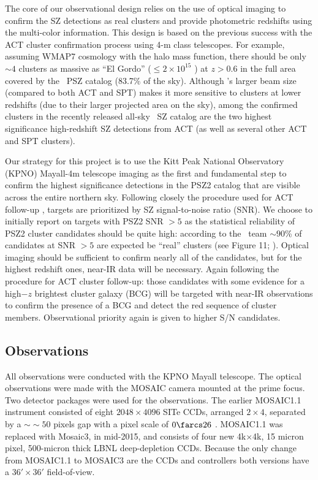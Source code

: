 \documentclass[apj, revtex4-1]{emulateapj}
\begin{document}
The core of our observational design relies on the use of optical imaging to confirm the SZ detections as real clusters and provide photometric redshifts using the multi-color information. This design is based on the previous success with the ACT cluster confirmation process using 4-m class telescopes.
%
For example, assuming WMAP7 cosmology \citep{Komatsu2011} with the \cite{Tinker2008} halo mass function, there should be only $\sim4$ clusters as massive as “El Gordo” ($\leq 2 \times 10^{15}$ \Msol) at $z > 0.6$ in the full area covered by the \planck\ PSZ catalog (83.7\% of the sky). Although \planck’s larger beam size (compared to both ACT and SPT) makes it more sensitive to clusters at lower redshifts (due to their larger projected area on the sky), among the confirmed clusters in the recently released all-sky \planck\ SZ catalog are the two highest significance high-redshift SZ detections from ACT (as well as several other ACT and SPT clusters).

Our strategy for this project is to use the Kitt Peak National Observatory (KPNO) Mayall-4m telescope imaging as the first and fundamental step to confirm the highest significance detections in the PSZ2 catalog that are visible across the entire northern sky.
%
%
Following closely the procedure used for ACT follow-up , targets are prioritized by SZ signal-to-noise ratio (SNR). We choose to initially report on targets with PSZ2 SNR $>5$ as the statistical reliability of PSZ2 cluster candidates should be quite high: according to the \planck\ team $\sim90$\% of candidates at SNR $>5$ are expected be ``real'' clusters (see Figure 11; \citealt{PlanckCollaboration2016}).
%
Optical imaging should be sufficient to confirm nearly all of the candidates, but for the highest redshift ones, near-IR data will be necessary. Again following the procedure for ACT cluster follow-up: those candidates with some evidence for a high$-z$ brightest cluster galaxy (BCG) will be targeted with near-IR observations to confirm the presence of a BCG and detect the red sequence of cluster members. Observational priority again is given to higher S/N candidates.

\subsection{Observations}\label{sec: observations}
All observations were conducted with the KPNO Mayall telescope. The optical observations were made with the MOSAIC camera mounted at the prime focus. Two detector packages were used for the observations. The earlier MOSAIC1.1 instrument consisted of eight $2048\times4096$ SITe CCDs, arranged $2\times4$, separated by a $∼\sim50$ pixels gap with a pixel scale of $0\farcs26$ \perpixel. MOSAIC1.1 was replaced with Mosaic3, in mid-2015, and consists of four new 4k$\times$4k, 15 micron pixel, 500-micron thick LBNL deep-depletion CCDs. Because the only change from MOSAIC1.1 to MOSAIC3 are the CCDs and controllers both versions have a $36' \times 36'$ field-of-view.
\end{document}
